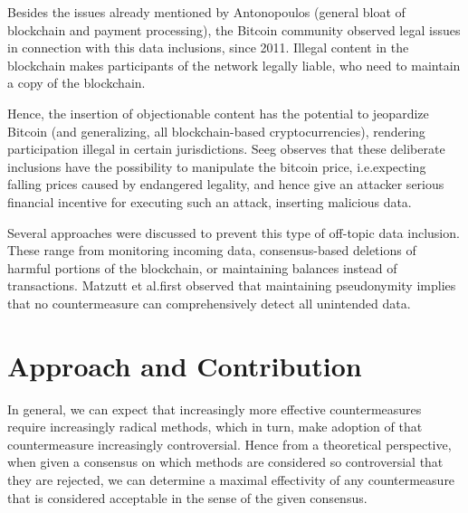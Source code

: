 \documentclass[a4paper,11pt,titlepage]{scrbook}
\begin{document}
Besides the issues already mentioned by Antonopoulos (general bloat of blockchain and payment processing), the Bitcoin community observed legal issues in connection with this data inclusions, since 2011.
Illegal content in the blockchain makes participants of the network legally liable, who need to maintain a copy of the blockchain.

Hence, the insertion of objectionable content has the potential to jeopardize Bitcoin (and generalizing, all blockchain-based cryptocurrencies), rendering participation illegal in certain jurisdictions.
Seeg observes that these deliberate inclusions have the possibility to manipulate the bitcoin price, i.e.\@ expecting falling prices caused by endangered legality, and hence give an attacker serious financial incentive for executing such an attack, inserting malicious data.

Several approaches were discussed to prevent this type of off-topic data inclusion.
These range from monitoring incoming data, consensus-based deletions of harmful portions of the blockchain, 
or maintaining balances instead of transactions.
Matzutt et al.\@ first observed that maintaining pseudonymity implies that no countermeasure can comprehensively detect all unintended data.





\section{Approach and Contribution}

In general, we can expect that increasingly more effective countermeasures require increasingly radical methods, which in turn, make adoption of that countermeasure increasingly controversial.
Hence from a theoretical perspective, when given a consensus on which methods are considered so controversial that they are rejected, we can determine a maximal effectivity of any countermeasure that is considered acceptable in the sense of the given consensus.
\end{document}
